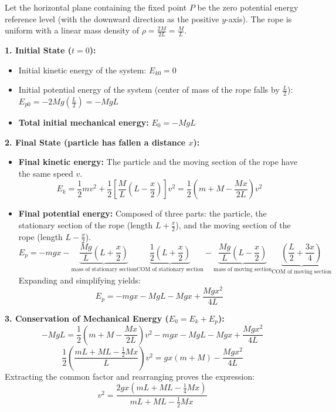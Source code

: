 \documentclass[12pt]{article}
\begin{document}
\newcommand{\ds}{\displaystyle}



Let the horizontal plane containing the fixed point $P$ be the zero potential energy reference level (with the downward direction as the positive $y$-axis). The rope is uniform with a linear mass density of $\rho = \frac{2M}{2L} = \frac{M}{L}$.

\textbf{1. Initial State ($t=0$):}
\begin{itemize}
    \item Initial kinetic energy of the system: $E_{k0} = 0$
    \item Initial potential energy of the system (center of mass of the rope falls by $\frac{L}{2}$): $E_{p0} = -2Mg \left(\frac{L}{2}\right) = -MgL$
    \item \textbf{Total initial mechanical energy:} $E_0 = -MgL$
\end{itemize}

\textbf{2. Final State (particle has fallen a distance $x$):}
\begin{itemize}
    \item \textbf{Final kinetic energy:} The particle and the moving section of the rope have the same speed $v$.
    \[ E_{k} = \frac{1}{2}mv^2 + \frac{1}{2}\left[\frac{M}{L}\left(L - \frac{x}{2}\right)\right]v^2 = \frac{1}{2}\left(m + M - \frac{Mx}{2L}\right)v^2 \]
    \item \textbf{Final potential energy:} Composed of three parts: the particle, the stationary section of the rope (length $L + \frac{x}{2}$), and the moving section of the rope (length $L - \frac{x}{2}$).
    \[ E_{p} = -mgx - \underbrace{\frac{Mg}{L}\left(L + \frac{x}{2}\right)}_{\text{mass of stationary section}} \underbrace{\frac{1}{2}\left(L + \frac{x}{2}\right)}_{\text{COM of stationary section}} - \underbrace{\frac{Mg}{L}\left(L - \frac{x}{2}\right)}_{\text{mass of moving section}} \underbrace{\left(\frac{L}{2} + \frac{3x}{4}\right)}_{\text{COM of moving section}} \]
    Expanding and simplifying yields:
    \[ E_{p} = -mgx - MgL - Mgx + \frac{Mgx^2}{4L} \]
\end{itemize}

\textbf{3. Conservation of Mechanical Energy ($E_0 = E_k + E_p$):}
\[ -MgL = \frac{1}{2}\left(m + M - \frac{Mx}{2L}\right)v^2 - mgx - MgL - Mgx + \frac{Mgx^2}{4L} \]
\[ \frac{1}{2}\left(\frac{mL + ML - \frac{1}{2}Mx}{L}\right)v^2 = gx(m + M) - \frac{Mgx^2}{4L} \]
Extracting the common factor and rearranging proves the expression:
\[ v^2 = \frac{2gx(mL + ML - \frac{1}{4}Mx)}{mL + ML - \frac{1}{2}Mx} \]
\end{document}
